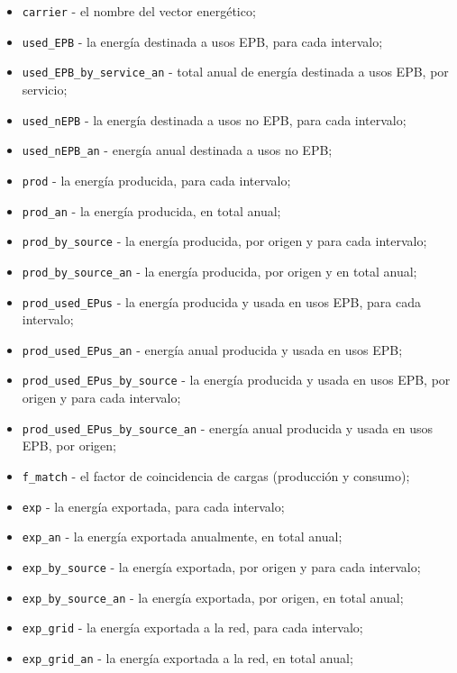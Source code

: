 \documentclass[10pt,notitlepage,oneside,a4paper]{article}
\begin{document}
\begin{itemize}
    \item \texttt{carrier} - el nombre del vector energético;
    \item \texttt{used\_EPB} - la energía destinada a usos EPB, para cada intervalo;
    \item \texttt{used\_EPB\_by\_service\_an} - total anual de energía destinada a usos EPB, por servicio;
    \item \texttt{used\_nEPB} - la energía destinada a usos no EPB, para cada intervalo;
    \item \texttt{used\_nEPB\_an} - energía anual destinada a usos no EPB;
    \item \texttt{prod} - la energía producida, para cada intervalo;
    \item \texttt{prod\_an} - la energía producida, en total anual;
    \item \texttt{prod\_by\_source} - la energía producida, por origen y para cada intervalo;
    \item \texttt{prod\_by\_source\_an} - la energía producida, por origen y en total anual;
    \item \texttt{prod\_used\_EPus} - la energía producida y usada en usos EPB, para cada intervalo;
    \item \texttt{prod\_used\_EPus\_an} - energía anual producida y usada en usos EPB;
    \item \texttt{prod\_used\_EPus\_by\_source} - la energía producida y usada en usos EPB, por origen y para cada intervalo;
    \item \texttt{prod\_used\_EPus\_by\_source\_an} - energía anual producida y usada en usos EPB, por origen;
    \item \texttt{f\_match} - el factor de coincidencia de cargas (producción y consumo);
    \item \texttt{exp} - la energía exportada, para cada intervalo;
    \item \texttt{exp\_an} - la energía exportada anualmente, en total anual;
    \item \texttt{exp\_by\_source} - la energía exportada, por origen y para cada intervalo;
    \item \texttt{exp\_by\_source\_an} - la energía exportada, por origen, en total anual;
    \item \texttt{exp\_grid} - la energía exportada a la red, para cada intervalo;
    \item \texttt{exp\_grid\_an} - la energía exportada a la red, en total anual;

\end{itemize}
\end{document}
